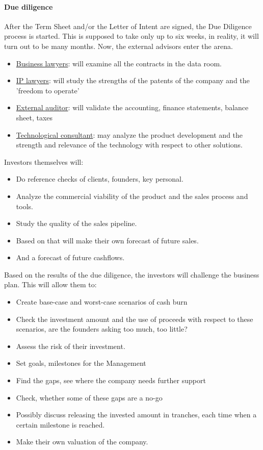 \paragraph{Due diligence}
After the Term Sheet and/or the Letter of Intent are signed, the Due Diligence
process is started. This is supposed to take only up to six weeks, in reality,
it will turn out to be many months. Now, the external advisors enter the arena.
\begin{itemize}
    \item \underline{Business lawyers}: will examine all the contracts in the data room.
    \item \underline{IP lawyers}: will study the strengths of the patents of the company
        and the 'freedom to operate'
    \item \underline{External auditor}: will validate the accounting, finance statements,
        balance sheet, taxes
    \item \underline{Technological consultant}: may analyze the product development
        and the strength and relevance of the technology with respect to other solutions.
\end{itemize}
Investors themselves will:
\begin{itemize}
    \item Do reference checks of clients, founders, key personal.
    \item Analyze the commercial viability of the product and the sales process
        and tools.
    \item Study the quality of the sales pipeline.
    \item Based on that will make their own forecast of future sales.
    \item And a forecast of future cashflows.
\end{itemize} 
Based on the results of the due diligence, the investors will challenge the
business plan. This will allow them to:
\begin{itemize}
    \item Create base-case and worst-case scenarios of cash burn
    \item Check the investment amount and the use of proceeds with respect to these
        scenarios, are the founders asking too much, too little?
    \item Assess the risk of their investment.
    \item Set goals, milestones for the Management
    \item Find the gaps, see where the company needs further support
    \item Check, whether some of these gaps are a no-go
    \item Possibly discuss releasing the invested amount in tranches, each time
        when a certain milestone is reached.
    \item Make their own valuation of the company.
\end{itemize}
